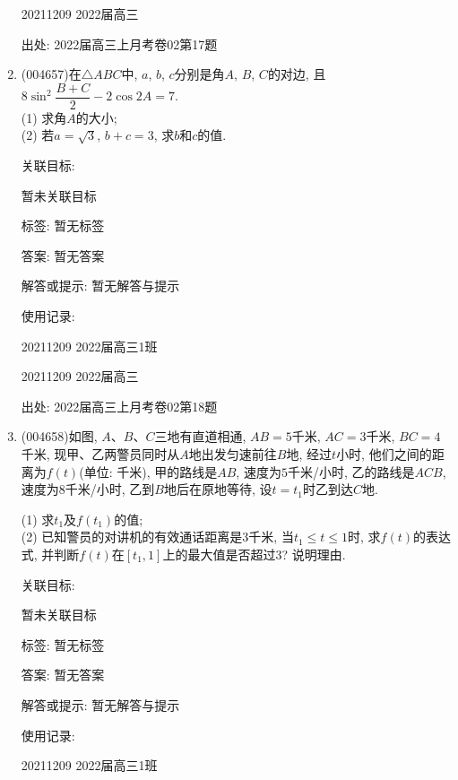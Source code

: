 \documentclass[10pt,a4paper]{article}
\begin{document}
\begin{enumerate}[1.]
20211209	2022届高三		


出处: 2022届高三上月考卷02第17题
\item { (004657)}在$\triangle ABC$中, $a$, $b$, $c$分别是角$A$, $B$, $C$的对边, 且$8\sin^2\dfrac{B+C}2-2\cos 2A=7$.\\
(1) 求角$A$的大小;\\
(2) 若$a=\sqrt 3$, $b+c=3$, 求$b$和$c$的值.


关联目标:

暂未关联目标



标签: 暂无标签

答案: 暂无答案

解答或提示: 暂无解答与提示

使用记录:

20211209	2022届高三1班		

20211209	2022届高三		


出处: 2022届高三上月考卷02第18题
\item { (004658)}如图, $A$、$B$、$C$三地有直道相通, $AB=5$千米, $AC=3$千米, $BC=4$千米, 现甲、乙两警员同时从$A$地出发匀速前往$B$地, 经过$t$小时, 他们之间的距离为$f(t)$(单位: 千米), 甲的路线是$AB$, 速度为$5$千米/小时, 乙的路线是$ACB$, 速度为$8$千米/小时, 乙到$B$地后在原地等待, 设$t=t_1$时乙到达$C$地.
\begin{center}
\end{center}
(1) 求$t_1$及$f(t_1)$的值;\\
(2) 已知警员的对讲机的有效通话距离是$3$千米, 当$t_1\le t\le 1$时, 求$f(t)$的表达式, 并判断$f(t)$在$[t_1,1]$上的最大值是否超过$3$? 说明理由.


关联目标:

暂未关联目标



标签: 暂无标签

答案: 暂无答案

解答或提示: 暂无解答与提示

使用记录:

20211209	2022届高三1班		


\end{enumerate}
\end{document}

